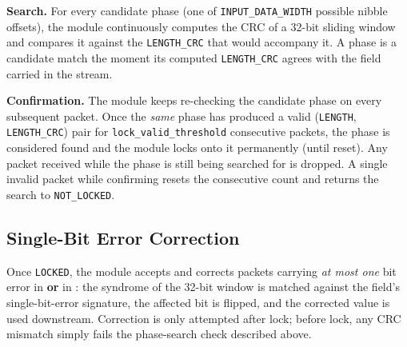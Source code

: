 \documentclass[11pt,a4paper]{article}
\begin{document}
\textbf{Search.} For every candidate phase (one of \texttt{INPUT\_DATA\_WIDTH}
possible nibble offsets), the module continuously computes the CRC of a
32-bit sliding window and compares it against the \texttt{LENGTH\_CRC} that
would accompany it. A phase is a candidate match the moment its computed
\texttt{LENGTH\_CRC} agrees with the field carried in the stream.

\textbf{Confirmation.} The module keeps re-checking the candidate phase on
every subsequent packet. Once the \emph{same} phase has produced a valid
(\texttt{LENGTH}, \texttt{LENGTH\_CRC}) pair for \texttt{lock\_valid\_threshold}
consecutive packets, the phase is considered found and the module locks
onto it permanently (until reset). Any packet received while the phase is
still being searched for is dropped. A single invalid packet while
confirming resets the consecutive count and returns the search to
\texttt{NOT\_LOCKED}.

\begin{center}
\end{center}

\subsection{Single-Bit Error Correction}
Once \texttt{LOCKED}, the module accepts and corrects packets carrying
\emph{at most one} bit error in 
\textbf{or} in : the syndrome of the
32-bit window is matched against the field's single-bit-error signature,
the affected bit is flipped, and the corrected value is used downstream.
Correction is only attempted after lock; before lock, any CRC mismatch
simply fails the phase-search check described above.
\end{document}
